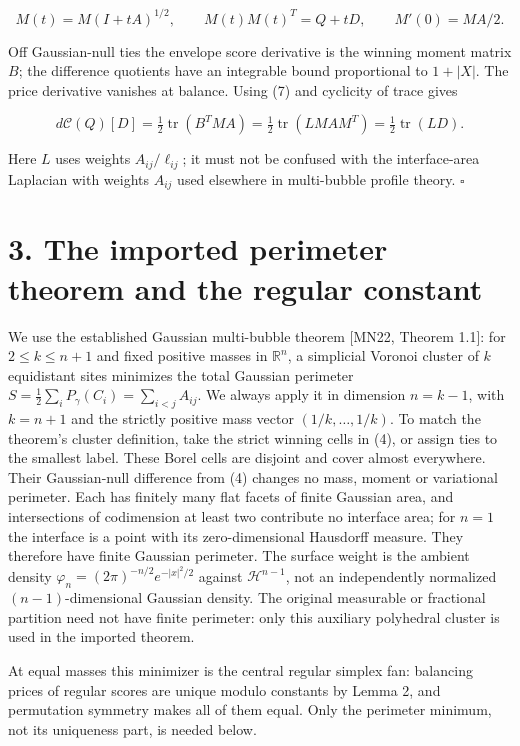 \documentclass[
  11pt,
]{article}
\begin{document}
\[
 M(t)=M(I+tA)^{1/2},\qquad M(t)M(t)^T=Q+tD,\qquad
 M'(0)=MA/2.
\]

Off Gaussian-null ties the envelope score derivative is the winning
moment matrix \(B\); the difference quotients have an integrable bound
proportional to \(1+|X|\). The price derivative vanishes at balance.
Using (7) and cyclicity of trace gives

\[
 d\mathcal C(Q)[D]=\tfrac12\operatorname{tr}(B^TMA)
   =\tfrac12\operatorname{tr}(LMAM^T)
   =\tfrac12\operatorname{tr}(LD).
\]

Here \(L\) uses weights \(A_{ij}/\ell_{ij}\); it must not be confused
with the interface-area Laplacian with weights \(A_{ij}\) used elsewhere
in multi-bubble profile theory. \(\square\)

\section{3. The imported perimeter theorem and the regular
constant}\label{the-imported-perimeter-theorem-and-the-regular-constant}

We use the established Gaussian multi-bubble theorem {[}MN22, Theorem
1.1{]}: for \(2\le k\le n+1\) and fixed positive masses in
\(\mathbb R^n\), a simplicial Voronoi cluster of \(k\) equidistant sites
minimizes the total Gaussian perimeter
\(S=\frac12\sum_i P_\gamma(C_i)=\sum_{i<j}A_{ij}\). We always apply it
in dimension \(n=k-1\), with \(k=n+1\) and the strictly positive mass
vector \((1/k,\ldots,1/k)\). To match the theorem's cluster definition,
take the strict winning cells in (4), or assign ties to the smallest
label. These Borel cells are disjoint and cover almost everywhere. Their
Gaussian-null difference from (4) changes no mass, moment or variational
perimeter. Each has finitely many flat facets of finite Gaussian area,
and intersections of codimension at least two contribute no interface
area; for \(n=1\) the interface is a point with its zero-dimensional
Hausdorff measure. They therefore have finite Gaussian perimeter. The
surface weight is the ambient density
\(\varphi_n=(2\pi)^{-n/2}e^{-|x|^2/2}\) against \(\mathcal H^{n-1}\),
not an independently normalized \((n-1)\)-dimensional Gaussian density.
The original measurable or fractional partition need not have finite
perimeter: only this auxiliary polyhedral cluster is used in the
imported theorem.

At equal masses this minimizer is the central regular simplex fan:
balancing prices of regular scores are unique modulo constants by Lemma
2, and permutation symmetry makes all of them equal. Only the perimeter
minimum, not its uniqueness part, is needed below.
\end{document}
